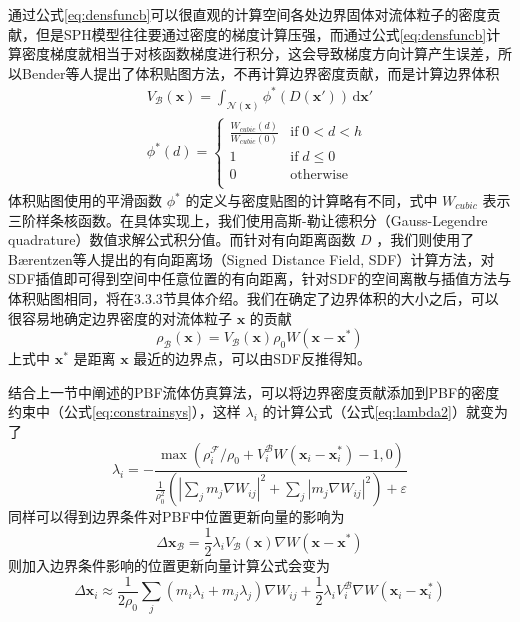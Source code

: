     通过公式\ref{eq:densfuncb}可以很直观的计算空间各处边界固体对流体粒子的密度贡献，但是SPH模型往往要通过密度的梯度计算压强，而通过公式\ref{eq:densfuncb}计算密度梯度就相当于对核函数梯度进行积分，这会导致梯度方向计算产生误差，所以Bender等人\cite{BKW19SPHB}提出了体积贴图方法，不再计算边界密度贡献，而是计算边界体积
    \begin{equation}
    	\begin{gathered}
    	V_{\mathcal B} (\mathbf x) = 
    	\int_{\mathcal N(\mathbf x)} \phi^* (D(\mathbf x')) \, \mathrm d \mathbf x' 
    	\\
    	\phi^*(d) = 
    	\left\{
    	\begin{array}{ll}
    	\frac{W_{cubic}(d)}{W_{cubic}(0)} & \mathrm{if} \; 0 < d < h \\
    	1 & \mathrm{if} \; d \le 0 \\
    	0 & \mathrm{otherwise} \\
    	\end{array}
    	\right.
    	\end{gathered}
    \end{equation}
    体积贴图使用的平滑函数 $\phi^*$ 的定义与密度贴图的计算略有不同，式中 $W_{cubic}$ 表示三阶样条核函数\cite{MCG03SPH}。在具体实现上，我们使用高斯-勒让德积分（Gauss-Legendre quadrature）数值求解公式积分值。而针对有向距离函数 $D$ ，我们则使用了Bærentzen等人\cite{BH05SDF}提出的有向距离场（Signed Distance Field, SDF）计算方法，对SDF插值即可得到空间中任意位置的有向距离，针对SDF的空间离散与插值方法与体积贴图相同，将在3.3.3节具体介绍。我们在确定了边界体积的大小之后，可以很容易地确定边界密度的对流体粒子 $\mathbf x$ 的贡献
    \begin{equation}
    	\rho_{\mathcal B}(\mathbf x) =
    	V_{\mathcal B} (\mathbf x) \rho_0 W(\mathbf x - \mathbf x^*)
    \end{equation}
    上式中 $\mathbf x^*$ 是距离 $\mathbf x$ 最近的边界点，可以由SDF反推得知。
    
    结合上一节中阐述的PBF流体仿真算法，可以将边界密度贡献添加到PBF的密度约束中（公式\ref{eq:constrainsys}），这样 $\lambda_i$ 的计算公式（公式\ref{eq:lambda2}）就变为了
    \begin{equation}
    	\lambda_i = - \frac 
    	{ \max(\rho_i^{\mathcal F} / \rho_0 + V_i^{\mathcal B} W(\mathbf x_i - \mathbf x_i^*) - 1, 0) }
    	{ \frac {1}{\rho_0^2} (|\sum_j m_j \nabla W_{ij}|^2 + \sum_j |m_j \nabla W_{ij}|^2 ) + \varepsilon }
    \end{equation}
    同样可以得到边界条件对PBF中位置更新向量的影响为
    \begin{equation}
    	\Delta \mathbf x_{\mathcal B} = \frac{1}{2} \lambda_i V_{\mathcal B}(\mathbf x) \nabla W(\mathbf x - \mathbf x^*)
    \end{equation}
    则加入边界条件影响的位置更新向量计算公式会变为
    \begin{equation}
    	\Delta \mathbf x_i \approx
    	\frac{1}{2\rho_0} \sum_j (m_i \lambda_i + m_j \lambda_j) \nabla W_{ij} +
    	\frac{1}{2} \lambda_i V_i^{\mathcal B} \nabla W(\mathbf x_i - \mathbf x_i^*)
    \end{equation}
    
